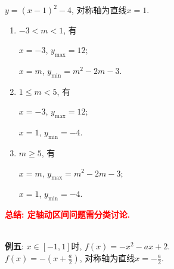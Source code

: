 \documentclass[8pt]{article}
\begin{document}
					$y=(x-1)^2-4$, 对称轴为直线$x=1$.

					\begin{enumerate}[label=$\arabic*^{\circ}$]
						\item $-3<m<1$, 有

							$x=-3$, $y_{\max}=12;$

							$x=m$, $y_{\min}=m^2-2m-3.$

						\item $1\leq m<5$, 有

							$x=-3$, $y_{\max}=12;$

							$x=1$, $y_{\min}=-4.$

						\item $m\geq 5$, 有

							$x=m$, $y_{\max}=m^2-2m-3;$

							$x=1$, $y_{\min}=-4.$

					\end{enumerate}

					\textbf{\textcolor{red}{总结: 定轴动区间问题需分类讨论.}}

				~\\

				\textbf{例五}: $x\in[-1, 1]$时, $f(x)=-x^2-ax+2$.
					~\\

					$f(x)=-\left(x+\frac{a}{2}\right)$, 对称轴为直线$x=-\frac{a}{2}$.
\end{document}
